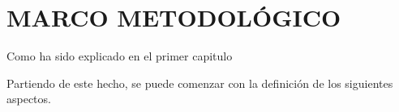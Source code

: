 
\section{MARCO METODOLÓGICO}

Como ha sido explicado en el primer capitulo

Partiendo de este hecho, se puede comenzar con la definición de los siguientes aspectos.